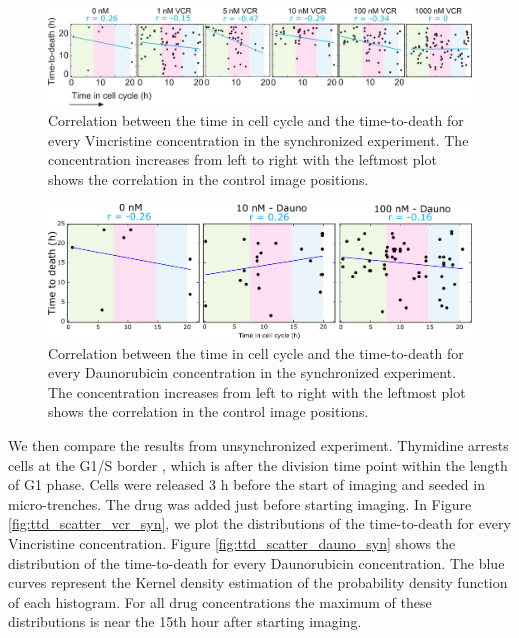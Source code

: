 \documentclass[pdftex,12pt,a4paper]{report}
\begin{document}
\begin{figure}[H]
\centering
\includegraphics[width=\textwidth]{images/ttd/unsyn/vcr_scatter.pdf}
\caption[TIC vs TTD correlation for every Vincristine concentration in the synchronized experiment]{Correlation between the time in cell cycle and the time-to-death for every Vincristine concentration in the synchronized experiment. The concentration increases from left to right with the leftmost plot shows the correlation in the control image positions.}
\label{fig:ttd_scatter_vcr}
\end{figure}

\begin{figure}[H]
\centering
\includegraphics[width=\textwidth]{images/ttd/unsyn/dauno_scatter.pdf}
\caption[TIC vs TTD correlation for every Daunorubicin concentration in the synchronized experiment]{Correlation between the time in cell cycle and the time-to-death for every Daunorubicin concentration in the synchronized experiment. The concentration increases from left to right with the leftmost plot shows the correlation in the control image positions.}
\label{fig:ttd_scatter_dauno}
\end{figure}

We then compare the results from unsynchronized experiment. Thymidine arrests cells at the G1/S border \cite{jackman2001methods}, which is after the division time point within the length of G1 phase. Cells were released 3 h before the start of imaging and seeded in micro-trenches. The drug was added just before starting imaging. In Figure \ref{fig:ttd_scatter_vcr_syn}, we plot the distributions of the time-to-death for every Vincristine concentration. Figure \ref{fig:ttd_scatter_dauno_syn} shows the distribution of the time-to-death for every Daunorubicin concentration. The blue curves represent the Kernel density estimation of the probability density function of each histogram. For all drug concentrations the maximum of these distributions is near the 15th hour after starting imaging.
\end{document}
